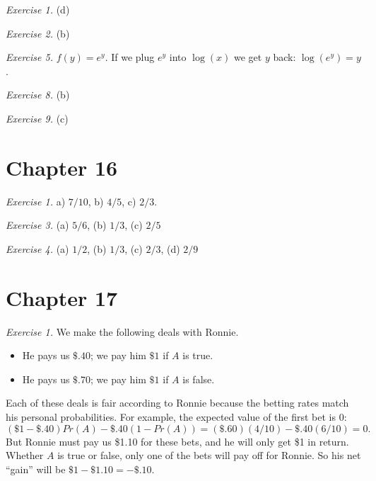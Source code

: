 \documentclass[justified]{tufte-book}
\providecommand{\tightlist}{%
  \setlength{\itemsep}{0pt}\setlength{\parskip}{0pt}}
\newcommand{\p}{Pr}
\theoremstyle{definition}
\theoremstyle{definition}
\theoremstyle{definition}
\theoremstyle{definition}
\theoremstyle{remark}
\begin{document}
\noindent
\emph{Exercise 1.} (d)

\vspace{.5em}

\noindent
\emph{Exercise 2.} (b)

\vspace{.5em}

\noindent
\emph{Exercise 5.} \(f(y) = e^y\). If we plug \(e^y\) into \(\log(x)\) we get \(y\) back: \(\log(e^y) = y\).

\vspace{.5em}

\noindent
\emph{Exercise 8.} (b)

\vspace{.5em}

\noindent
\emph{Exercise 9.} (c)

\hypertarget{chapter-16}{%
\section*{Chapter 16}\label{chapter-16}}

\noindent
\emph{Exercise 1.} a) \(7/10\), b) \(4/5\), c) \(2/3\).

\vspace{.5em}

\noindent
\emph{Exercise 3.} (a) \(5/6\), (b) \(1/3\), (c) \(2/5\)

\vspace{.5em}

\noindent
\emph{Exercise 4.} (a) \(1/2\), (b) \(1/3\), (c) \(2/3\), (d) \(2/9\)

\hypertarget{chapter-17}{%
\section*{Chapter 17}\label{chapter-17}}

\noindent
\emph{Exercise 1.} We make the following deals with Ronnie.

\begin{itemize}
\tightlist
\item
  He pays us \(\$.40\); we pay him \(\$1\) if \(A\) is true.
\item
  He pays us \(\$.70\); we pay him \(\$1\) if \(A\) is false.
\end{itemize}

Each of these deals is fair according to Ronnie because the betting rates match his personal probabilities. For example, the expected value of the first bet is 0:
\[ (\$1 - \$.40) \p(A) - \$.40 (1 - \p(A)) = (\$.60)(4/10) - \$.40(6/10) = 0. \]
But Ronnie must pay us \$1.10 for these bets, and he will only get \$1 in return. Whether \(A\) is true or false, only one of the bets will pay off for Ronnie. So his net ``gain'' will be \(\$1 - \$1.10 = -\$.10\).
\end{document}
